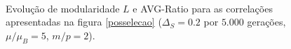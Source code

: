 \begin{figure}[htbp]
    \vspace{-18pt}
    \vspace{11pt}
    \\
    \caption{Evolução de modularidade $L$ e AVG-Ratio para as correlações
    apresentadas na figura \ref{posselecao} ($\Delta_S = 0.2$ por $5.000$ gerações, $\mu/\mu_B=5$, $m/p=2$).}
    \label{posselecaoStats}
\end{figure}

